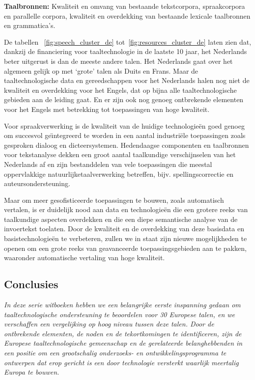 \begin{multicols}{2}
\textbf{Taalbronnen:} Kwaliteit en omvang van bestaande tekstcorpora, spraakcorpora en parallelle corpora, kwaliteit en overdekking van bestaande lexicale taalbronnen en grammatica's.


De tabellen ~\ref{fig:speech_cluster_de} tot~\ref{fig:resources_cluster_de}  laten zien dat, dankzij de financiering voor taaltechnologie in de laatste 10 jaar, het Nederlands beter uitgerust is dan de meeste andere talen. Het Nederlands gaat over het algemeen gelijk op met `grote' talen als Duits en Frans. Maar de taaltechnologische data en gereedschappen voor het Nederlands halen nog niet de kwaliteit en overdekking voor het Engels, dat op bijna alle taaltechnologische gebieden aan de leiding gaat. En er zijn ook nog genoeg ontbrekende elementen voor het Engels met betrekking tot toepassingen van hoge kwaliteit.

   Voor spraakverwerking is de kwaliteit van de huidige technologie{\"e}n goed genoeg om succesvol ge{\"\i}ntegreerd te worden in een aantal industri{\"e}le toepassingen zoals gesproken dialoog en dicteersystemen. Hedendaagse componenten en taalbronnen voor tekstanalyse dekken een groot aantal taalkundige verschijnselen van het Nederlands af en zijn bestanddelen van vele toepassingen die meestal oppervlakkige natuurlijketaalverwerking betreffen, bijv. spellingscorrectie en auteursondersteuning.

   Maar om meer gesofisticeerde toepassingen te bouwen, zoals automatisch vertalen, is er duidelijk nood aan data en technologie{\"e}n die een grotere reeks van taalkundige aspecten overdekken en die een diepe semantische analyse van de invoertekst toelaten. Door de kwaliteit en de overdekking van deze basisdata en basistechnologie{\"e}n te verbeteren, zullen we in staat zijn nieuwe mogelijkheden te openen om een grote reeks van geavanceerde toepassingsgebieden aan te pakken, waaronder automatische vertaling van hoge kwaliteit.


\subsection{Conclusies}

\emph{In deze serie witboeken hebben we een belangrijke eerste inspanning gedaan om taaltechnologische ondersteuning te beoordelen voor 30 Europese talen, en we verschaffen een vergelijking op hoog niveau tussen deze talen. Door de ontbrekende elementen, de noden en de tekortkomingen te identificeren, zijn de Europese taaltechnologische gemeenschap en de gerelateerde belanghebbenden in een positie om een grootschalig onderzoeks- en ontwikkelingsprogramma te ontwerpen dat erop gericht is een door technologie versterkt waarlijk meertalig Europa te bouwen.}


\end{multicols}
